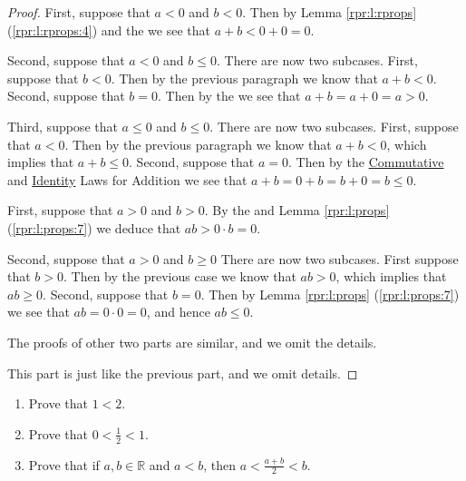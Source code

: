 \begin{proof}
	\hfill

	First, suppose that $a < 0$ and $b < 0$. Then by Lemma \ref{rpr:l:rprops} (\ref{rpr:l:rprops:4}) and the  we see that $a + b < 0 + 0 = 0$.

	Second, suppose that $a < 0$ and $b \leq 0$. There are now two subcases. First, suppose that $b < 0$. Then by the previous paragraph we know that $a + b < 0$. Second, suppose that $b = 0$. Then by the  we see that $a + b = a + 0 = a > 0$.

	Third, suppose that $a \leq 0$ and $b \leq 0$. There are now two subcases. First, suppose that $a < 0$. Then by the previous paragraph we know that $a + b < 0$, which implies that $a + b \leq 0$. Second, suppose that $a = 0$. Then by the \hyperref[rax:d:props:commutative_add]{Commutative} and \hyperref[rax:d:props:identity_add]{Identity} Laws for Addition we see that $a + b = 0 + b = b + 0 = b \leq 0$.

	First, suppose that $a > 0$ and $b > 0$. By the  and Lemma \ref{rpr:l:props} (\ref{rpr:l:props:7}) we deduce that $a b > 0 \cdot b = 0$.

	Second, suppose that $a > 0$ and $b \geq 0$ There are now two subcases. First suppose that $b > 0$. Then by the previous case we know that $a b > 0$, which implies that $a b \geq 0$. Second, suppose that $b = 0$. Then by Lemma \ref{rpr:l:props} (\ref{rpr:l:props:7}) we see that $a b = 0 \cdot 0 = 0$, and hence $a b \leq 0$.

	The proofs of other two parts are similar, and we omit the details.

	This part is just like the previous part, and we omit details.
\end{proof}


\Newpage
\begin{exercise} %
	\label{rpr:e:5}
	\hfill

	\begin{enumerate}
		\item \label{rpr:e:5:1} Prove that $1 < 2$.
		\item \label{rpr:e:5:2} Prove that $0 < \frac{1}{2} < 1$.
		\item \label{rpr:e:5:3} Prove that if $a, b \in \mathbb{R}$ and $a < b$, then $a < \frac{a + b}{2} < b$.
	\end{enumerate}
\end{exercise}

